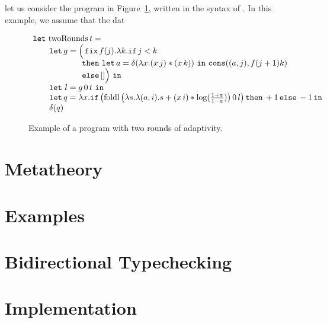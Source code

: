 \documentclass[acmsmall,review,anonymous]{acmart}\settopmatter{printfolios=true,printccs=false,printacmref=false}
\begin{document}
let us consider the program in Figure~\ref{fig:two-rounds}, written in the syntax of \THESYSTEM. In this example, we assume that the dat
\begin{figure}
  \centering
  $$
  \begin{array}{l}
    \mathop{\mathtt{let}}\, \mathrm{twoRounds}\, t = \\
\qquad \mathop{\mathtt{let}} g = \Big (\mathop{\mathtt{fix}} f(j).\lambda k.
	\mathtt{if}\,  j < k\, \\
\qquad \qquad \qquad \mathtt{then}\,  \mathop{\mathtt{let}} a = \delta(\lambda x. (x\, j) * (x\, k))\, 
	\mathop{ \mathtt{in}}\, 
	\mathop{\mathtt{cons}}((a,j), f (j +1) k)\\
\qquad \qquad \qquad \mathtt{else}\, [] \Big )\, \mathop{ \mathtt{in}}\,\\
\qquad \mathop{\mathtt{let}}\, l = g\, 0\, t\, \mathop{ \mathtt{in}}\\
\qquad \mathop{\mathtt{let}} q = \lambda x. \mathtt{if}\, \big (\mathrm{foldl}\, 
      \big (\lambda
    s. \lambda (a,i). s + (x\, i) * \log(\frac{1 + a}{1 - a} ) \big )\, 0\,
    l \big )\, \mathtt{then}\, +1\, \mathtt{else}\, -1
		\mathop{ \mathtt{in}} \\
\qquad \delta(q)
  \end{array}
  $$
  \caption{Example of a program with two rounds of adaptivity.}
  \label{fig:two-rounds}
\end{figure}


\section{\THESYSTEM}

\section{Metatheory}

\section{Examples}

\section{Bidirectional Typechecking}

\section{Implementation}
\end{document}

